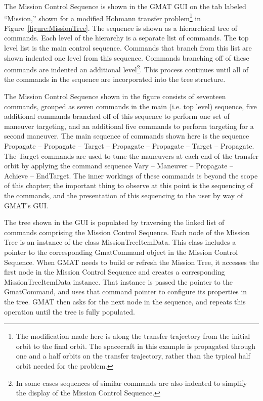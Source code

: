 The Mission Control Sequence is shown in the GMAT GUI on the tab labeled ``Mission,'' shown for a
modified Hohmann transfer problem\footnote{The modification made here is along the transfer
trajectory from the initial orbit to the final orbit.  The spacecraft in this example is propagated
through one and a half orbits on the transfer trajectory, rather than the typical half orbit needed
for the problem.} in Figure~\ref{figure:MissionTree}.  The sequence is shown as a hierarchical tree
of commands.  Each level of the hierarchy is a separate list of commands.  The top level list is the
main control sequence.  Commands that branch from this list are shown indented one level from this
sequence.  Commands branching off of these commands are indented an additional level\footnote{In
some cases sequences of similar commands are also indented to simplify the display of the Mission
Control Sequence.}.  This process continues until all of the commands in the sequence are
incorporated into the tree structure.

The Mission Control Sequence shown in the figure consists of seventeen commands, grouped as seven
commands in the main (i.e. top level) sequence, five additional commands branched off of this
sequence to perform one set of maneuver targeting, and an additional five commands to perform
targeting for a second maneuver.  The main sequence of commands shown here is the sequence Propagate
-- Propagate -- Target -- Propagate -- Propagate -- Target -- Propagate.  The Target commands are
used to tune the maneuvers at each end of the transfer orbit by applying the command sequence Vary
-- Maneuver -- Propagate -- Achieve -- EndTarget.  The inner workings of these commands is beyond
the scope of this chapter; the important thing to observe at this point is the sequencing of the
commands, and the presentation of this sequencing to the user by way of GMAT's GUI.

The tree shown in the GUI is populated by traversing the linked list of commands comprising the
Mission Control Sequence.  Each node of the Mission Tree is an instance of the class
MissionTreeItemData.  This class includes a pointer to the corresponding GmatCommand object in the
Mission Control Sequence.  When GMAT needs to build or refresh the Mission Tree, it accesses the
first node in the Mission Control Sequence and creates a corresponding MissionTreeItemData instance.
That instance is passed the pointer to the GmatCommand, and uses that command pointer to configure
its properties in the tree.  GMAT then asks for the next node in the sequence, and repeats this
operation until the tree is fully populated.

